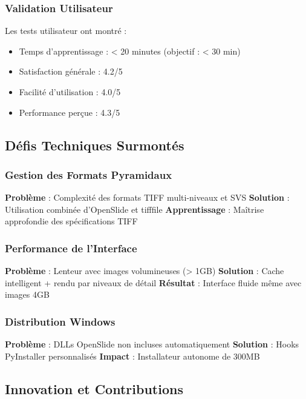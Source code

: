 \documentclass[12pt,a4paper]{article}
\begin{document}
\subsubsection{Validation Utilisateur}

Les tests utilisateur ont montré :
\begin{itemize}
\item Temps d'apprentissage : < 20 minutes (objectif : < 30 min)
\item Satisfaction générale : 4.2/5
\item Facilité d'utilisation : 4.0/5
\item Performance perçue : 4.3/5
\end{itemize}

\subsection{Défis Techniques Surmontés}

\subsubsection{Gestion des Formats Pyramidaux}

\textbf{Problème} : Complexité des formats TIFF multi-niveaux et SVS
\textbf{Solution} : Utilisation combinée d'OpenSlide et tifffile
\textbf{Apprentissage} : Maîtrise approfondie des spécifications TIFF

\subsubsection{Performance de l'Interface}

\textbf{Problème} : Lenteur avec images volumineuses (> 1GB)
\textbf{Solution} : Cache intelligent + rendu par niveaux de détail
\textbf{Résultat} : Interface fluide même avec images 4GB

\subsubsection{Distribution Windows}

\textbf{Problème} : DLLs OpenSlide non incluses automatiquement
\textbf{Solution} : Hooks PyInstaller personnalisés
\textbf{Impact} : Installateur autonome de 300MB

\subsection{Innovation et Contributions}
\end{document}
